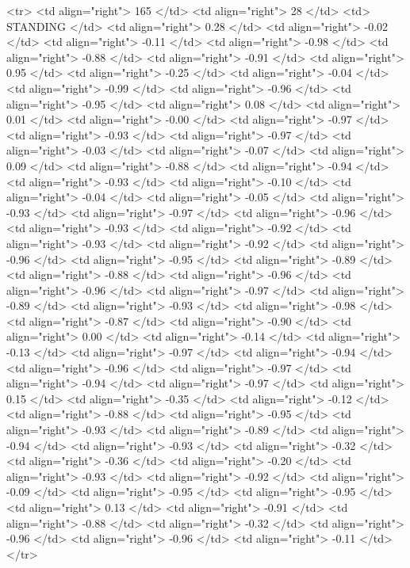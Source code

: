   <tr> <td align="right"> 165 </td> <td align="right">  28 </td> <td> STANDING </td> <td align="right"> 0.28 </td> <td align="right"> -0.02 </td> <td align="right"> -0.11 </td> <td align="right"> -0.98 </td> <td align="right"> -0.88 </td> <td align="right"> -0.91 </td> <td align="right"> 0.95 </td> <td align="right"> -0.25 </td> <td align="right"> -0.04 </td> <td align="right"> -0.99 </td> <td align="right"> -0.96 </td> <td align="right"> -0.95 </td> <td align="right"> 0.08 </td> <td align="right"> 0.01 </td> <td align="right"> -0.00 </td> <td align="right"> -0.97 </td> <td align="right"> -0.93 </td> <td align="right"> -0.97 </td> <td align="right"> -0.03 </td> <td align="right"> -0.07 </td> <td align="right"> 0.09 </td> <td align="right"> -0.88 </td> <td align="right"> -0.94 </td> <td align="right"> -0.93 </td> <td align="right"> -0.10 </td> <td align="right"> -0.04 </td> <td align="right"> -0.05 </td> <td align="right"> -0.93 </td> <td align="right"> -0.97 </td> <td align="right"> -0.96 </td> <td align="right"> -0.93 </td> <td align="right"> -0.92 </td> <td align="right"> -0.93 </td> <td align="right"> -0.92 </td> <td align="right"> -0.96 </td> <td align="right"> -0.95 </td> <td align="right"> -0.89 </td> <td align="right"> -0.88 </td> <td align="right"> -0.96 </td> <td align="right"> -0.96 </td> <td align="right"> -0.97 </td> <td align="right"> -0.89 </td> <td align="right"> -0.93 </td> <td align="right"> -0.98 </td> <td align="right"> -0.87 </td> <td align="right"> -0.90 </td> <td align="right"> 0.00 </td> <td align="right"> -0.14 </td> <td align="right"> -0.13 </td> <td align="right"> -0.97 </td> <td align="right"> -0.94 </td> <td align="right"> -0.96 </td> <td align="right"> -0.97 </td> <td align="right"> -0.94 </td> <td align="right"> -0.97 </td> <td align="right"> 0.15 </td> <td align="right"> -0.35 </td> <td align="right"> -0.12 </td> <td align="right"> -0.88 </td> <td align="right"> -0.95 </td> <td align="right"> -0.93 </td> <td align="right"> -0.89 </td> <td align="right"> -0.94 </td> <td align="right"> -0.93 </td> <td align="right"> -0.32 </td> <td align="right"> -0.36 </td> <td align="right"> -0.20 </td> <td align="right"> -0.93 </td> <td align="right"> -0.92 </td> <td align="right"> -0.09 </td> <td align="right"> -0.95 </td> <td align="right"> -0.95 </td> <td align="right"> 0.13 </td> <td align="right"> -0.91 </td> <td align="right"> -0.88 </td> <td align="right"> -0.32 </td> <td align="right"> -0.96 </td> <td align="right"> -0.96 </td> <td align="right"> -0.11 </td> </tr>
